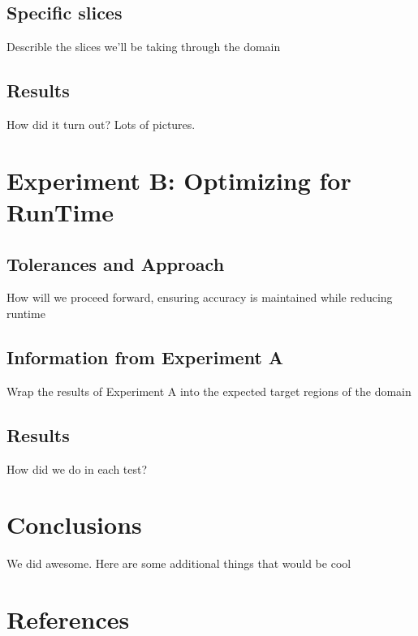 \documentclass{article}
\begin{document}
  \subsection*{Specific slices}
   Describle the slices we'll be taking through the domain 
  \subsection*{Results}
   How did it turn out?  Lots of pictures.

 \section*{Experiment B: Optimizing for RunTime}
  \subsection*{Tolerances and Approach}
   How will we proceed forward, ensuring accuracy is maintained while reducing runtime
  \subsection*{Information from Experiment A}
   Wrap the results of Experiment A into the expected target regions of the domain
  \subsection*{Results}
   How did we do in each test?

 \section*{Conclusions}
  We did awesome.  Here are some additional things that would be cool

 \section*{References}
  
   
\end{document}
